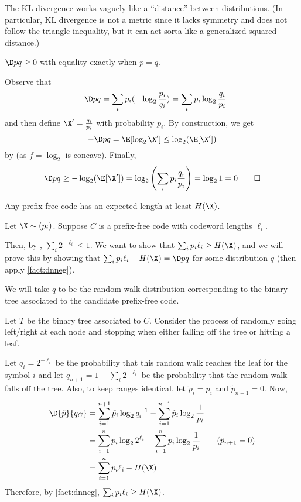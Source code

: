 \documentclass[class=co432,notes,tikz]{agony}
\begin{document}
The KL divergence works vaguely like a ``distance'' between distributions.
(In particular, KL divergence is not a metric since it lacks symmetry
and does not follow the triangle inequality,
but it can act sorta like a generalized squared distance.)

\begin{fact}\label{fact:dnneg}
  $\D p q \geq 0$ with equality exactly when $p = q$.
\end{fact}
\begin{prf}
  Observe that
  \[ -\D p q = \sum_i p_i(-\log_2\frac{p_i}{q_i}) = \sum_i p_i \log_2 \frac{q_i}{p_i} \]
  and then define $\X' = \frac{q_i}{p_i}$ with probability $p_i$.
  By construction, we get
  \[ -\D p q = \E[\log_2 \X'] \leq \log_2(\E[\X']) \]
  by  (as $f = \log_2$ is concave).
  Finally,
  \[ \D p q \geq -\log_2(\E[\X']) = \log_2\qty(\sum_i p_i \frac{q_i}{p_i}) = \log_2 1 = 0  \qedhere \]
\end{prf}

\begin{prop}
  Any prefix-free code has an expected length at least $H(\X)$.
\end{prop}
\begin{prf}
  Let $\X \sim (p_i)$.
  Suppose $C$ is a prefix-free code with codeword lengths $\ell_i$.

  Then, by , $\sum_i 2^{-\ell_i} \leq 1$.
  We want to show that $\sum_i p_i \ell_i \geq H(\X)$,
  and we will prove this by showing that $\sum_i p_i \ell_i - H(\X) =
    \D p q$ for some distribution $q$
  (then apply \cref{fact:dnneg}).

  We will take $q$ to be the random walk distribution corresponding to the binary tree
  associated to the candidate prefix-free code.

  Let $T$ be the binary tree associated to $C$.
  Consider the process of randomly going left/right at each node
  and stopping when either falling off the tree or hitting a leaf.

  Let $q_i = 2^{-\ell_i}$ be the probability that this random walk reaches the leaf for the symbol $i$
  and let $q_{n+1} = 1-\sum_i 2^{-\ell_i}$ be the probability that the random walk falls off the tree.
  Also, to keep ranges identical, let $\tilde p_i = p_i$ and $\tilde p_{n+1} = 0$. Now,
  \begin{align*}
    \D{\tilde p}{q_C}
     & = \sum_{i=1}^{n+1} \tilde p_i \log_2 q_i^{-1} - \sum_{i=1}^{n+1} \tilde p_i \log_2 \frac{1}{p_i}      \\
     & = \sum_{i=1}^n p_i \log_2 2^{\ell_i} - \sum_{i=1}^n p_i \log_2 \frac{1}{p_i} \tag{$\tilde p_{n+1}=0$} \\
     & = \sum_{i=1}^n p_i \ell_i - H(\X)
  \end{align*}
  Therefore, by \cref{fact:dnneg}, $\sum_i p_i \ell_i \geq H(\X)$.
\end{prf}
\end{document}
